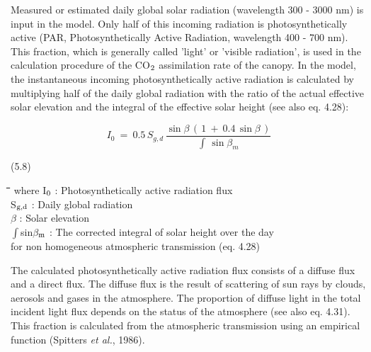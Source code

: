 \documentclass[11pt]{article}
\begin{document}
\bigskip
\bigskip
Measured or estimated daily global solar radiation  (wavelength 300 - 3000 nm) is input
in the model. Only half of this incoming radiation is photosynthetically active (PAR,
Photosynthetically Active Radiation, wavelength 400 - 700 nm). This fraction, which is
generally called 'light' or 'visible radiation', is used in the calculation procedure of the
CO$_{{\rm 2}}$ assimilation rate of the canopy. In the model, the instantaneous incoming photosyn\-thet\-ically active radiation is calculated by multiply\-ing half of the daily global radiation
with the ratio of the actual effective solar elevation and the integral of the effective solar
height (see also eq. 4.28):

\begin{displaymath}
I _{0} ~=~ 0.5\, S _{g,d} \,{\frac{\sin \beta \, (\, 1~+~0.4\, \sin \beta \, )}{\int \, \sin \beta _{m} }}
\end{displaymath}

\bigskip
\strut\hfill (5.8)

\nwln
\begin{tabbing}
\hspace{1.27cm}\=\hspace{1.27cm}\=\hspace{1.27cm}\=\hspace{1.27cm}\=%
\hspace{1.27cm}\=\hspace{1.27cm}\=\hspace{1.27cm}\=\hspace{1.27cm}\=%
\hspace{1.27cm}\=\hspace{1.27cm}\=\kill
where\> I$_{{\rm 0}}$\> : Photosynthetically active radia\-tion flux\> \> \> \> \> \> \> \> [J m$^{{\rm -2}}$ s$^{{\rm -1}}$]\\
\>S$_{{\rm g,d}}$\> : Daily global radiation\> \> \> \> \> \> \> \> [J m$^{{\rm -2}}$ d$^{{\rm -1}}$]\\
\>$\beta$\> : Solar elevation\> \> \> \> \> \> \> \> [degrees]\\
\>$\int$sin$\beta$$_{{\rm m}}$ : The corrected integral of solar height over the day \\
\>\>    for non homogeneous atmospheric transmission (eq. 4.28)\> \> \> \> \> \> \> \> [s]
\end{tabbing}

\bigskip
\bigskip
\bigskip
\bigskip
\bigskip
The calculated photosynthetically active radiation flux consists of a diffuse flux and a
direct flux. The diffuse flux is the result of scattering of sun rays by clouds, aerosols and
gases in the atmosphere. The proportion of diffuse light in the total incident light flux
depends on the status of the atmosphere (see also eq. 4.31). This fraction is calculated
from the atmospheric transmission using an empirical function (Spitters {\it et al.\/}, 1986).
\end{document}
